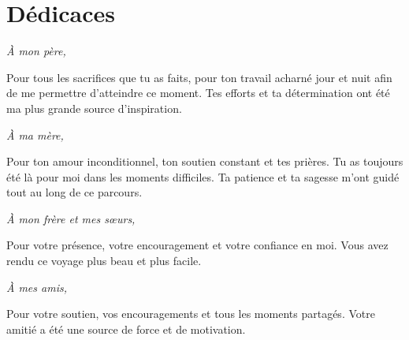 \chapter*{Dédicaces}

\vspace{2cm}

\begin{center}
    \large

    \textit{À mon père,}

    \normalsize
    Pour tous les sacrifices que tu as faits, pour ton travail acharné jour et nuit afin de me permettre d'atteindre ce moment. Tes efforts et ta détermination ont été ma plus grande source d'inspiration.

    \vspace{1cm}

    \large
    \textit{À ma mère,}

    \normalsize
    Pour ton amour inconditionnel, ton soutien constant et tes prières. Tu as toujours été là pour moi dans les moments difficiles. Ta patience et ta sagesse m'ont guidé tout au long de ce parcours.

    \vspace{1cm}

    \large
    \textit{À mon frère et mes sœurs,}

    \normalsize
    Pour votre présence, votre encouragement et votre confiance en moi. Vous avez rendu ce voyage plus beau et plus facile.

    \vspace{1cm}

    \large
    \textit{À mes amis,}

    \normalsize
    Pour votre soutien, vos encouragements et tous les moments partagés. Votre amitié a été une source de force et de motivation.

\end{center}

\vspace{1cm}
